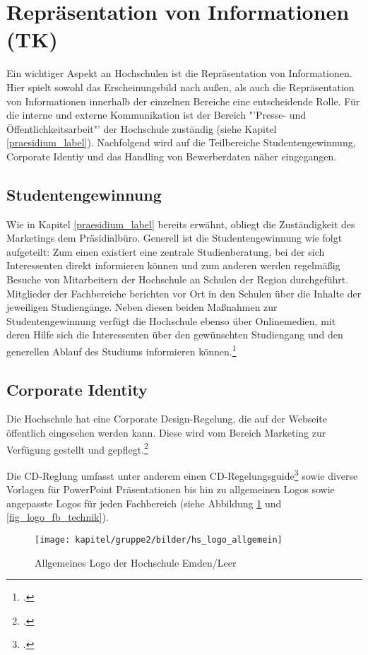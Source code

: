 \section{Repräsentation von Informationen (TK)}
Ein wichtiger Aspekt an Hochschulen ist die Repräsentation von Informationen. Hier spielt sowohl das 
Erscheinungsbild nach außen, als auch die Repräsentation von Informationen innerhalb der einzelnen Bereiche 
eine entscheidende Rolle. Für die interne und externe Kommunikation ist der Bereich "'Presse- und 
Öffentlichkeitsarbeit"' der Hochschule zuständig (siehe Kapitel \ref{praesidium_label}). Nachfolgend wird auf 
die Teilbereiche Studentengewinnung, Corporate Identiy und das Handling von Bewerberdaten näher 
eingegangen.

\subsection{Studentengewinnung}
Wie in Kapitel \ref{praesidium_label} bereits erwähnt, obliegt die Zuständigkeit des Marketings dem 
Präsidialbüro. Generell ist die Studentengewinnung wie folgt aufgeteilt: Zum einen existiert eine zentrale 
Studienberatung, bei der sich Interessenten direkt informieren können und zum anderen werden regelmäßig 
Besuche von Mitarbeitern der Hochschule an Schulen der Region durchgeführt. Mitglieder der Fachbereiche 
berichten vor Ort in den Schulen über die Inhalte der jeweiligen Studiengänge. Neben diesen beiden 
Maßnahmen zur Studentengewinnung verfügt die Hochschule ebenso über Onlinemedien, mit deren Hilfe sich 
die Interessenten über den gewünschten Studiengang und den generellen Ablauf des  Studiums informieren 
können.\footcite{gunter_muller_interview}


\subsection{Corporate Identity}
Die Hochschule hat eine Corporate Design-Regelung, die auf der Webseite öffentlich eingesehen werden 
kann. Diese wird vom Bereich Marketing zur Verfügung gestellt und 
gepflegt.\footcite[Vgl.][]{hsel_CD}
\clearpage

Die CD-Reglung umfasst unter anderem einen 
CD-Regelungsguide\footcite{hsel_CD_manual} sowie diverse Vorlagen für PowerPoint 
Präsentationen bis hin zu allgemeinen Logos sowie angepasste Logos für jeden Fachbereich (siehe Abbildung 
\ref{fig_logo_allgemein} und \ref{fig_logo_fb_technik}).

\begin{figure}[h!]
	\centering
	\texttt{[image: kapitel/gruppe2/bilder/hs\_logo\_allgemein]}
	\caption{Allgemeines Logo der Hochschule Emden/Leer\protect\footnotemark}
	\label{fig_logo_allgemein}
\end{figure}

